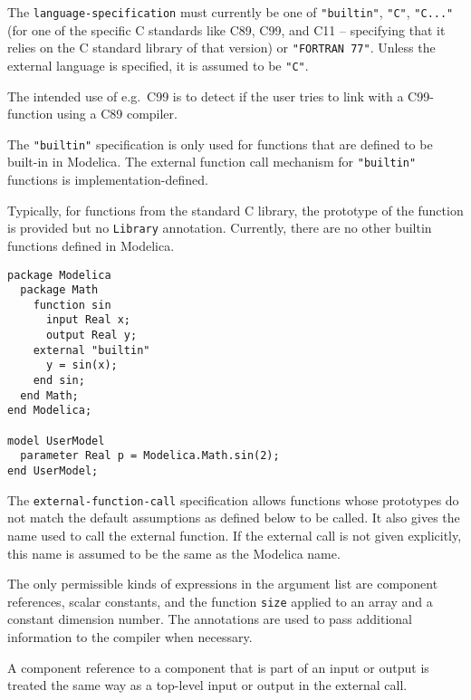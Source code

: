 The \lstinline[language=grammar]!language-specification! must currently be one of \lstinline!"builtin"!, \lstinline!"C"!, \lstinline!"C..."! (for one of the specific C standards like C89, C99, and C11 -- specifying
that it relies on the C standard library of that version) or \lstinline!"FORTRAN 77"!.  Unless the external language is specified, it is assumed to be \lstinline!"C"!.

\begin{nonnormative}
The intended use of e.g.\ C99 is to detect if the user tries to link with a C99-function using a C89 compiler.
\end{nonnormative}

The \lstinline!"builtin"! specification is only used for functions that are defined to be built-in in Modelica.  The external function call mechanism for \lstinline!"builtin"! functions is implementation-defined.

\begin{nonnormative}
Typically, for functions from the standard C library, the prototype of the function is provided but no \lstinline!Library! annotation.  Currently, there are no other builtin functions defined in Modelica.
\end{nonnormative}

\begin{example}
\begin{lstlisting}[language=modelica]
package Modelica
  package Math
    function sin
      input Real x;
      output Real y;
    external "builtin"
      y = sin(x);
    end sin;
  end Math;
end Modelica;

model UserModel
  parameter Real p = Modelica.Math.sin(2);
end UserModel;
\end{lstlisting}
\end{example}

The \lstinline[language=grammar]!external-function-call! specification allows functions whose prototypes do not match the default assumptions as defined below to be called.  It also gives the name used to call the external function.  If the external call is not given explicitly, this name is assumed to be the same as the Modelica name.

The only permissible kinds of expressions in the argument list are component references, scalar constants, and the function \lstinline!size! applied to an array and a constant dimension number.
The annotations are used to pass additional information to the compiler when necessary.

A component reference to a component that is part of an input or output
is treated the same way as a top-level input or output in the external
call.

